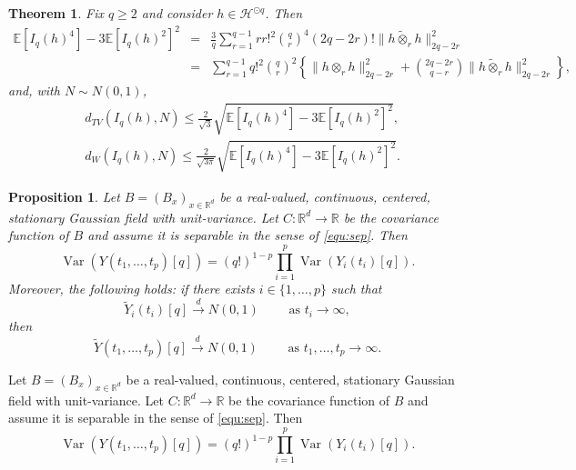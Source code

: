 \documentclass[10pt,a4paper]{amsart}
\newtheorem{theorem}{Theorem}
\newtheorem{proposition}{Proposition}
\newcommand{\E}{\mathbb{E}}
\newcommand{\R}{\mathbb{R}}
\DeclareMathOperator{\var}{Var}
\begin{document}
\begin{theorem}\label{thm:4thQuant}
Fix $q\ge 2$ and consider $h\in \mathcal H^{\odot q}$. 
Then
\begin{eqnarray}
\E[I_q(h)^4]-3\E[I_q(h)^2]^2
&=&\frac3q\sum_{r=1}^{q-1} rr!^2\binom{q}{r}^4(2q-2r)!
\|h\widetilde{\otimes}_r  h\|^2_{2q-2r}\\
&=&\sum_{r=1}^{q-1} q!^2\binom{q}{r}^2\left\{\|h\otimes_r h\|^2_{2q-2r}+\binom{2q-2r}{q-r}\|h\widetilde{\otimes}_r h\|^2_{2q-2r}\right\},
\end{eqnarray}
and, with $N\sim N(0,1)$,
\begin{align}
    &d_{TV}(I_q(h),N)\le \frac{2}{\sqrt{3}}\sqrt{\E[I_q(h)^4]-3\E[I_q(h)^2]^2},\\
    &{d_{W}(I_q(h),N)\le \frac{2}{\sqrt{3\pi}}\sqrt{\E[I_q(h)^4]-3\E[I_q(h)^2]^2}.} 
\end{align}
\end{theorem}

\begin{proposition}\label{prop:suffHq}
    Let $B=(B_x)_{x\in\R^d}$ be a real-valued, continuous, centered, stationary Gaussian field with unit-variance. Let $C:\R^d \rightarrow \R$ be the covariance function of $B$ and assume it is separable in the sense of \eqref{equ:sep}. Then \begin{equation}\label{equ:varHq}
        \var(Y(t_1,\ldots,t_p)[q]) = (q!)^{1-p} \prod_{i=1}^p \var (Y_i{(t_i)}[q]).
    \end{equation}
    Moreover, the following holds: if there exists $i\in\{1,\ldots,p\}$ such that
    \begin{equation}
        \widetilde{Y}_{i}(t_i)[q]\overset{d}{\rightarrow} N(0,1) \quad \quad \text{ as } t_i \to \infty,
    \end{equation}
    then
        \begin{equation}
         \widetilde{Y}(t_1,\ldots,t_p)[q]\overset{d}{\rightarrow} N(0,1) \quad \quad \text{ as } t_1,\ldots,t_p \to \infty.
        \end{equation}
\end{proposition}

    Let $B=(B_x)_{x\in\R^d}$ be a real-valued, continuous, centered, stationary Gaussian field with unit-variance. Let $C:\R^d \rightarrow \R$ be the covariance function of $B$ and assume it is separable in the sense of \eqref{equ:sep}. Then \begin{equation}
        \var(Y(t_1,\ldots,t_p)[q]) = (q!)^{1-p} \prod_{i=1}^p \var (Y_i{(t_i)}[q]).
    \end{equation}
\end{document}
